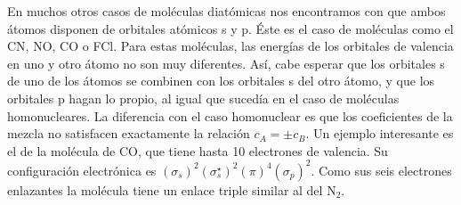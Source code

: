 En muchos otros casos de moléculas diatómicas nos
encontramos con que ambos átomos disponen de orbitales
atómicos s y p. Éste es el caso de moléculas como el 
CN, NO, CO o FCl. Para estas moléculas, las energías 
de los orbitales de valencia en uno y otro átomo no son muy diferentes. Así, cabe esperar que los orbitales s de uno de
los átomos se combinen con los orbitales s del otro átomo, 
y que los orbitales p hagan lo propio, al igual que sucedía
en el caso de moléculas homonucleares. La diferencia con 
el caso homonuclear es que los coeficientes de la mezcla 
no satisfacen exactamente la relación $c_A = \pm c_B$.
Un ejemplo interesante es el de la molécula de CO, que 
tiene hasta 10 electrones de valencia. Su configuración
electrónica es 
$(\sigma_s)^2(\sigma_s^{\star})^2(\pi)^4(\sigma_p)^2$. 
Como sus seis electrones enlazantes la molécula tiene un
enlace triple similar al del N$_2$.
